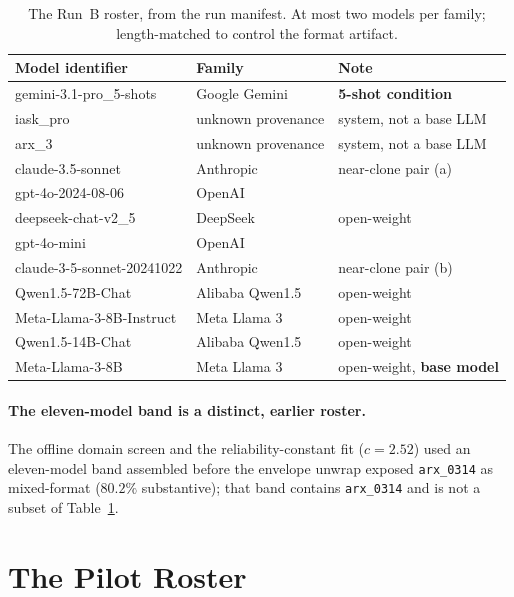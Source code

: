 \begin{table}[h]
\centering
\caption{The Run~B roster, from the run manifest. At most two models
per family; length-matched to control the format artifact.}
\label{tab:model-roster}
\begin{tabular}{p{5.2cm}p{3.2cm}p{4.4cm}}
\toprule
Model identifier & Family & Note \\
\midrule
gemini-3.1-pro\_5-shots & Google Gemini & \textbf{5-shot condition} \\
iask\_pro & unknown provenance & system, not a base LLM \\
arx\_3 & unknown provenance & system, not a base LLM \\
claude-3.5-sonnet & Anthropic & near-clone pair (a) \\
gpt-4o-2024-08-06 & OpenAI & \\
deepseek-chat-v2\_5 & DeepSeek & open-weight \\
gpt-4o-mini & OpenAI & \\
claude-3-5-sonnet-20241022 & Anthropic & near-clone pair (b) \\
Qwen1.5-72B-Chat & Alibaba Qwen1.5 & open-weight \\
Meta-Llama-3-8B-Instruct & Meta Llama 3 & open-weight \\
Qwen1.5-14B-Chat & Alibaba Qwen1.5 & open-weight \\
Meta-Llama-3-8B & Meta Llama 3 & open-weight, \textbf{base model} \\
\bottomrule
\end{tabular}
\end{table}

\paragraph{The eleven-model band is a distinct, earlier roster.} The
offline domain screen and the reliability-constant fit ($c = 2.52$)
used an eleven-model band assembled before the envelope unwrap exposed
\texttt{arx\_0314} as mixed-format ($80.2\%$ substantive); that band
contains \texttt{arx\_0314} and is not a subset of
Table~\ref{tab:model-roster}. 

\section{The Pilot Roster}

